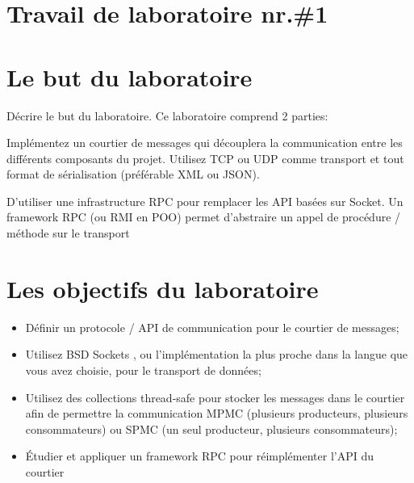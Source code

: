 \section*{Travail de laboratoire nr.\#1}

\section{Le but du laboratoire}

Décrire le but du laboratoire.
Ce laboratoire comprend 2 parties:

Implémentez un courtier de messages qui découplera la communication entre les différents composants du projet. Utilisez TCP ou UDP comme transport et tout format de sérialisation (préférable XML ou JSON).

D'utiliser une infrastructure RPC pour remplacer les API basées sur Socket. Un framework RPC (ou RMI en POO) permet d'abstraire un appel de procédure / méthode sur le transport


\section{Les objectifs du laboratoire}
\begin{itemize}
	\item Définir un protocole / API de communication pour le courtier de messages;
	\item Utilisez BSD Sockets , ou l'implémentation la plus proche dans la langue que vous avez choisie, pour le transport de données;
	\item Utilisez des collections thread-safe pour stocker les messages dans le courtier afin de permettre la communication MPMC (plusieurs producteurs, plusieurs consommateurs) ou SPMC (un seul producteur, plusieurs consommateurs);
	\item Étudier et appliquer un framework RPC pour réimplémenter l'API du courtier
	
	
\end{itemize}

\clearpage